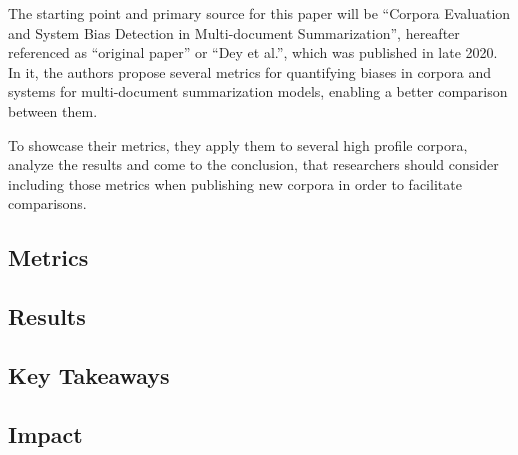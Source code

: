 \documentclass[../main.tex]{subfiles}
\begin{document}
The starting point and primary source for this paper will be
\enquote{Corpora Evaluation and System Bias Detection in Multi-document Summarization}\cite{dey-etal-2020-corpora}, hereafter referenced as \enquote{original paper} or \enquote{Dey et al.}, which was published in late 2020.
In it, the authors propose several metrics for quantifying biases in corpora and systems for multi-document summarization models, enabling a better comparison between them.

To showcase their metrics, they apply them to several high profile corpora, analyze the results and come to the conclusion, that researchers should consider including those metrics when publishing new corpora in order to facilitate comparisons.

\subsection{Metrics}
\label{sec:metrics}


\subsection{Results}
\label{sec:results}


\subsection{Key Takeaways}
\label{sec:takewawys}


\subsection{Impact}
\label{sec:impact}

\end{document}
